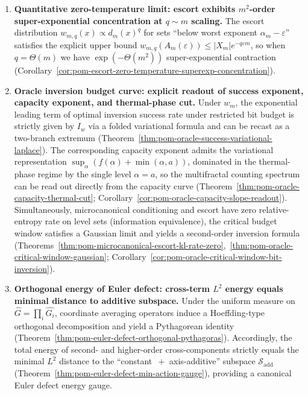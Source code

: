 \begin{enumerate}
  \item \textbf{Quantitative zero-temperature limit: escort exhibits \texorpdfstring{$m^2$}{m^2}-order super-exponential concentration at \texorpdfstring{$q\sim m$}{q~m} scaling.}
  The escort distribution \(w_{m,q}(x)\propto d_m(x)^q\) for sets ``below worst exponent \(\alpha_m-\varepsilon\)'' satisfies the explicit upper bound \(w_{m,q}(A_m(\varepsilon))\le |X_m|e^{-q\varepsilon m}\), so when \(q=\Theta(m)\) we have \(\exp(-\Theta(m^2))\) super-exponential contraction (Corollary~\ref{cor:pom-escort-zero-temperature-superexp-concentration}).

  \item \textbf{Oracle inversion budget curve: explicit readout of success exponent, capacity exponent, and thermal-phase cut.}
  Under \(w_m\), the exponential leading term of optimal inversion success rate under restricted bit budget is strictly given by \(I_w\) via a folded variational formula and can be recast as a two-branch extremum (Theorem~\ref{thm:pom-oracle-success-variational-laplace}).
  The corresponding capacity exponent admits the variational representation \(\sup_{\alpha}(f(\alpha)+\min(\alpha,a))\), dominated in the thermal-phase regime by the single level \(\alpha=a\), so the multifractal counting spectrum can be read out directly from the capacity curve (Theorem~\ref{thm:pom-oracle-capacity-thermal-cut}; Corollary~\ref{cor:pom-oracle-capacity-slope-readout}).
  Simultaneously, microcanonical conditioning and escort have zero relative-entropy rate on level sets (information equivalence), the critical budget window satisfies a Gaussian limit and yields a second-order inversion formula (Theorems~\ref{thm:pom-microcanonical-escort-kl-rate-zero},~\ref{thm:pom-oracle-critical-window-gaussian}; Corollary~\ref{cor:pom-oracle-critical-window-bit-inversion}).

  \item \textbf{Orthogonal energy of Euler defect: cross-term \texorpdfstring{$L^2$}{L2} energy equals minimal distance to additive subspace.}
  Under the uniform measure on \(\widehat G=\prod_i\widehat{G_i}\), coordinate averaging operators induce a Hoeffding-type orthogonal decomposition and yield a Pythagorean identity (Theorem~\ref{thm:pom-euler-defect-orthogonal-pythagoras}).
  Accordingly, the total energy of second- and higher-order cross-components strictly equals the minimal \(L^2\) distance to the ``constant \(\,+\) axis-additive'' subspace \(\mathcal S_{\mathrm{add}}\) (Theorem~\ref{thm:pom-euler-defect-min-action-gauge}), providing a canonical Euler defect energy gauge.
\end{enumerate}


